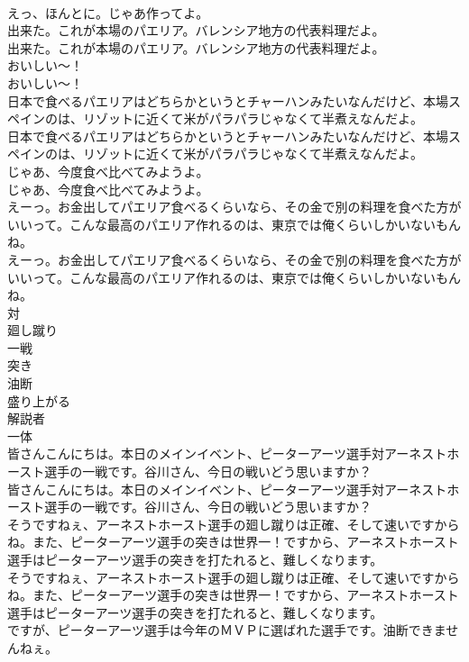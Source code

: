 \documentclass[8pt]{extreport}
\begin{document}
\begin{CJK}{UTF8}{min}
\\	えっ、ほんとに。じゃあ作ってよ。 
\\	出来た。これが本場のパエリア。バレンシア地方の代表料理だよ。	
\\	出来た。これが本場のパエリア。バレンシア地方の代表料理だよ。 
\\	おいしい〜！	
\\	おいしい〜！ 
\\	日本で食べるパエリアはどちらかというとチャーハンみたいなんだけど、本場スペインのは、リゾットに近くて米がパラパラじゃなくて半煮えなんだよ。	
\\	日本で食べるパエリアはどちらかというとチャーハンみたいなんだけど、本場スペインのは、リゾットに近くて米がパラパラじゃなくて半煮えなんだよ。 
\\	じゃあ、今度食べ比べてみようよ。	
\\	じゃあ、今度食べ比べてみようよ。 
\\	えーっ。お金出してパエリア食べるくらいなら、その金で別の料理を食べた方がいいって。こんな最高のパエリア作れるのは、東京では俺くらいしかいないもんね。	
\\	えーっ。お金出してパエリア食べるくらいなら、その金で別の料理を食べた方がいいって。こんな最高のパエリア作れるのは、東京では俺くらいしかいないもんね。 
\\	対
\\	廻し蹴り
\\	一戦
\\	突き
\\	油断
\\	盛り上がる
\\	解説者
\\	一体
\\	皆さんこんにちは。本日のメインイベント、ピーターアーツ選手対アーネストホースト選手の一戦です。谷川さん、今日の戦いどう思いますか？	
\\	皆さんこんにちは。本日のメインイベント、ピーターアーツ選手対アーネストホースト選手の一戦です。谷川さん、今日の戦いどう思いますか？ 
\\	そうですねぇ、アーネストホースト選手の廻し蹴りは正確、そして速いですからね。また、ピーターアーツ選手の突きは世界一！ですから、アーネストホースト選手はピーターアーツ選手の突きを打たれると、難しくなります。	
\\	そうですねぇ、アーネストホースト選手の廻し蹴りは正確、そして速いですからね。また、ピーターアーツ選手の突きは世界一！ですから、アーネストホースト選手はピーターアーツ選手の突きを打たれると、難しくなります。 
\\	ですが、ピーターアーツ選手は今年のＭＶＰに選ばれた選手です。油断できませんねぇ。	

\end{CJK}
\end{document}
